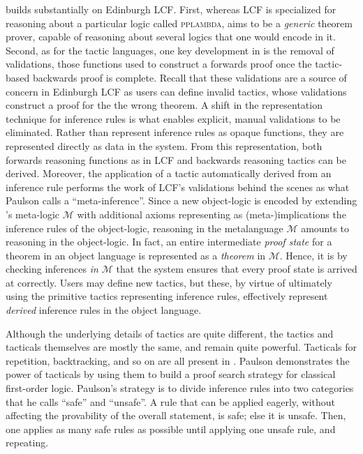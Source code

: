 \isb{} builds substantially on Edinburgh LCF.
First, whereas LCF is specialized for reasoning about a particular logic called
\textsc{pplambda}, \isb{} aims to be a \emph{generic} theorem prover, capable of
reasoning about several logics that one would encode in it\footnotemark.
Second, as for the tactic languages, one key development in \isb{} is the
removal of validations, those functions used to construct a forwards proof
once the tactic-based backwards proof is complete.
%
%
Recall that these validations are a source of concern in Edinburgh LCF as users
can define invalid tactics, whose validations construct a proof for the the
wrong theorem.
A shift in the representation technique for inference rules is what enables
explicit, manual validations to be eliminated.
Rather than represent inference rules as opaque functions, they are represented
directly as data in the system.
From this representation, both forwards reasoning functions as in LCF and
backwards reasoning tactics can be derived.
Moreover, the application of a tactic automatically derived from an inference
rule performs the work of LCF's validations behind the scenes as what Paulson
calls a ``meta-inference''.
Since a new object-logic is encoded by extending \isb's meta-logic
\newcommand{\M}{$\mathcal{M}$}%
\M{} with additional axioms representing as
(meta-)implications the inference rules of the object-logic,
reasoning in the metalanguage \M{} amounts to reasoning in the object-logic.
In fact, an entire intermediate \emph{proof state} for a theorem in an object
language is represented as a \emph{theorem} in \M.
Hence, it is by checking inferences \emph{in \M{}} that the system ensures that
every proof state is arrived at correctly.
Users may define new tactics, but these, by virtue of ultimately using the
primitive tactics representing inference rules, effectively represent
\emph{derived} inference rules in the object language.

Although the underlying details of tactics are quite different, the tactics and
tacticals themselves are mostly the same, and remain quite powerful.
Tacticals for repetition, backtracking, and so on are all present in
\isb.
Paulson demonstrates the power of tacticals by using them to build a proof
search strategy for classical first-order logic.
Paulson's strategy is to divide inference rules into two categories
that he calls ``safe'' and ``unsafe''.
A rule that can be applied eagerly, without affecting the provability of the
overall statement, is safe; else it is unsafe.
Then, one applies as many safe rules as possible until applying one unsafe rule,
and repeating.

